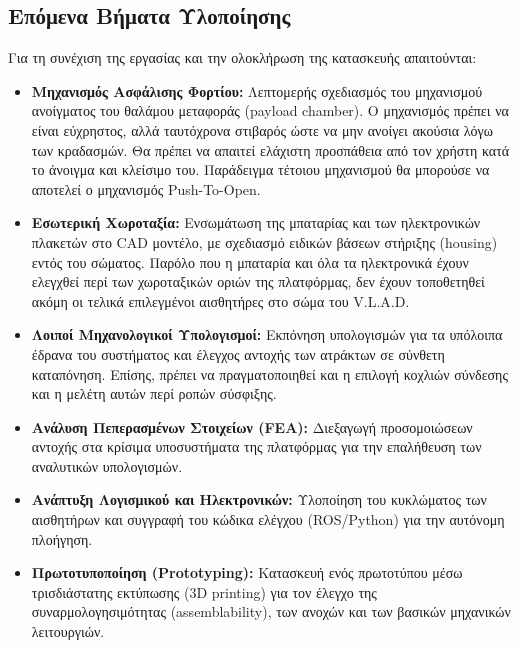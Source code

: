 \subsection{Επόμενα Βήματα Υλοποίησης}
Για τη συνέχιση της εργασίας και την ολοκλήρωση της κατασκευής απαιτούνται:
\begin{itemize}
    \item \textbf{Μηχανισμός Ασφάλισης Φορτίου:} Λεπτομερής σχεδιασμός του μηχανισμού ανοίγματος του θαλάμου μεταφοράς (payload chamber). Ο μηχανισμός πρέπει να είναι εύχρηστος, αλλά ταυτόχρονα στιβαρός ώστε να μην ανοίγει ακούσια λόγω των κραδασμών. Θα πρέπει να απαιτεί ελάχιστη προσπάθεια από τον χρήστη κατά το άνοιγμα και κλείσιμο του. Παράδειγμα τέτοιου μηχανισμού θα μπορούσε να αποτελεί ο μηχανισμός Push-To-Open.
    \item \textbf{Εσωτερική Χωροταξία:} Ενσωμάτωση της μπαταρίας και των ηλεκτρονικών πλακετών στο CAD μοντέλο, με σχεδιασμό ειδικών βάσεων στήριξης (housing) εντός του σώματος. Παρόλο που η μπαταρία και όλα τα ηλεκτρονικά έχουν ελεγχθεί περί των χωροταξικών οριών της πλατφόρμας, δεν έχουν τοποθετηθεί ακόμη οι τελικά επιλεγμένοι αισθητήρες στο σώμα του V.L.A.D.
    \item \textbf{Λοιποί Μηχανολογικοί Υπολογισμοί:} Εκπόνηση υπολογισμών για τα υπόλοιπα έδρανα του συστήματος και έλεγχος αντοχής των ατράκτων σε σύνθετη καταπόνηση. Επίσης, πρέπει να πραγματοποιηθεί και η επιλογή κοχλιών σύνδεσης και η μελέτη αυτών περί ροπών σύσφιξης.
    \item \textbf{Ανάλυση Πεπερασμένων Στοιχείων (FEA):} Διεξαγωγή προσομοιώσεων αντοχής στα κρίσιμα υποσυστήματα της πλατφόρμας για την επαλήθευση των αναλυτικών υπολογισμών.
    \item \textbf{Ανάπτυξη Λογισμικού και Ηλεκτρονικών:} Υλοποίηση του κυκλώματος των αισθητήρων και συγγραφή του κώδικα ελέγχου (ROS/Python) για την αυτόνομη πλοήγηση.
    \item \textbf{Πρωτοτυποποίηση (Prototyping):} Κατασκευή ενός πρωτοτύπου μέσω τρισδιάστατης εκτύπωσης (3D printing) για τον έλεγχο της συναρμολογησιμότητας (assemblability), των ανοχών και των βασικών μηχανικών λειτουργιών.
\end{itemize}